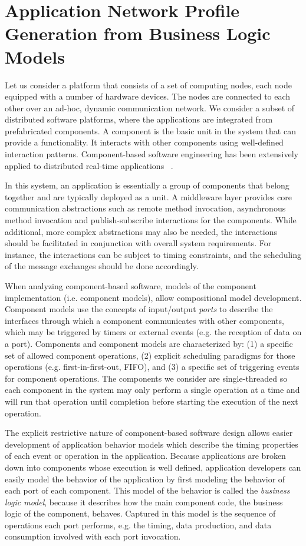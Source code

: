 \section{Application Network Profile Generation from Business Logic Models}
\label{sec:generation}

Let us consider a platform that consists of a set of computing nodes,
each node equipped with a number of hardware devices. The nodes are
connected to each other over an ad-hoc, dynamic communication network.
We consider a subset of distributed software platforms, where the
applications are integrated from prefabricated components. A component
is the basic unit in the system that can provide a functionality. It
interacts with other components using well-defined interaction
patterns. Component-based software engineering has been extensively
applied to distributed real-time applications
~\cite{Emb_SW_PECOS:02,RT_CIAO:04,PROGRESS_ICSEA:08,ACM_SPE:10,ISIS_F6_ISORC:13}.

In this system, an application is essentially a group of components
that belong together and are typically deployed as a unit. A
middleware layer provides core communication abstractions such as
remote method invocation, asynchronous method invocation and
publish-subscribe interactions for the components. While additional,
more complex abstractions may also be needed, the interactions should
be facilitated in conjunction with overall system requirements. For
instance, the interactions can be subject to timing constraints, and
the scheduling of the message exchanges should be done accordingly.

When analyzing component-based software, models of the component
implementation (i.e. component models), allow compositional model
development.  Component models use the concepts of input/output
\emph{ports} to describe the interfaces through which a component
communicates with other components, which may be triggered by timers
or external events (e.g. the reception of data on a port).  Components
and component models are characterized by: (1) a specific set of
allowed component operations, (2) explicit scheduling paradigms for
those operations (e.g. first-in-first-out, FIFO), and (3) a specific
set of triggering events for component operations.  The components we
consider are single-threaded so each component in the system may only
perform a single operation at a time and will run that operation until
completion before starting the execution of the next operation.

The explicit restrictive nature of component-based software design
allows easier development of application behavior models which
describe the timing properties of each event or operation in the
application.  Because applications are broken down into components
whose execution is well defined, application developers can easily
model the behavior of the application by first modeling the behavior
of each port of each component.  This model of the behavior is called
the \textit{business logic model}, because it describes how the main
component code, the business logic of the component, behaves.
Captured in this model is the sequence of operations each port
performs, e.g. the timing, data production, and data consumption
involved with each port invocation.

